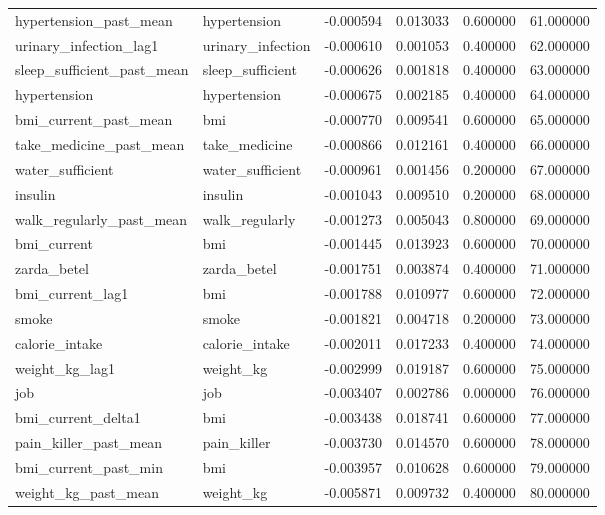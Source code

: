 \begin{longtable}{llrrrr}
hypertension\_past\_mean & hypertension & -0.000594 & 0.013033 & 0.600000 & 61.000000 \\
urinary\_infection\_lag1 & urinary\_infection & -0.000610 & 0.001053 & 0.400000 & 62.000000 \\
sleep\_sufficient\_past\_mean & sleep\_sufficient & -0.000626 & 0.001818 & 0.400000 & 63.000000 \\
hypertension & hypertension & -0.000675 & 0.002185 & 0.400000 & 64.000000 \\
bmi\_current\_past\_mean & bmi & -0.000770 & 0.009541 & 0.600000 & 65.000000 \\
take\_medicine\_past\_mean & take\_medicine & -0.000866 & 0.012161 & 0.400000 & 66.000000 \\
water\_sufficient & water\_sufficient & -0.000961 & 0.001456 & 0.200000 & 67.000000 \\
insulin & insulin & -0.001043 & 0.009510 & 0.200000 & 68.000000 \\
walk\_regularly\_past\_mean & walk\_regularly & -0.001273 & 0.005043 & 0.800000 & 69.000000 \\
bmi\_current & bmi & -0.001445 & 0.013923 & 0.600000 & 70.000000 \\
zarda\_betel & zarda\_betel & -0.001751 & 0.003874 & 0.400000 & 71.000000 \\
bmi\_current\_lag1 & bmi & -0.001788 & 0.010977 & 0.600000 & 72.000000 \\
smoke & smoke & -0.001821 & 0.004718 & 0.200000 & 73.000000 \\
calorie\_intake & calorie\_intake & -0.002011 & 0.017233 & 0.400000 & 74.000000 \\
weight\_kg\_lag1 & weight\_kg & -0.002999 & 0.019187 & 0.600000 & 75.000000 \\
job & job & -0.003407 & 0.002786 & 0.000000 & 76.000000 \\
bmi\_current\_delta1 & bmi & -0.003438 & 0.018741 & 0.600000 & 77.000000 \\
pain\_killer\_past\_mean & pain\_killer & -0.003730 & 0.014570 & 0.600000 & 78.000000 \\
bmi\_current\_past\_min & bmi & -0.003957 & 0.010628 & 0.600000 & 79.000000 \\
weight\_kg\_past\_mean & weight\_kg & -0.005871 & 0.009732 & 0.400000 & 80.000000 \\
\end{longtable}
